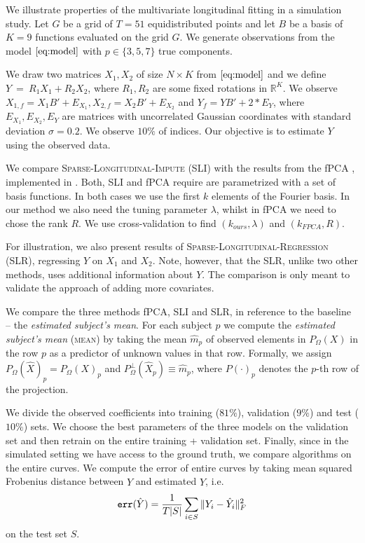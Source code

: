 \documentclass[preprint]{imsart}
\numberwithin{equation}{section}
\theoremstyle{plain}
\newcommand{\R}{\mathbb{R}}
\DeclareMathOperator*{\diag}{diag}
\begin{document}
We illustrate properties of the multivariate longitudinal fitting in a simulation study. Let $G$ be a grid of $T = 51$ equidistributed points and let $B$ be a basis of $K = 9$ functions evaluated on the grid $G$. We generate observations from the model $\eqref{eq:model}$ with $p \in \{3,5,7\}$ true components. %

We draw two matrices $X_1,X_2$ of size $N \times K$ from $\eqref{eq:model}$ and we define $Y~=~R_1 X_1 + R_2 X_2$, where $R_1,R_2$ are some fixed rotations in $\R^K$. We observe $X_{1,f} = X_1B' + E_{X_1}, X_{2,f} = X_2 B' + E_{X_2}$ and $Y_f = YB' + 2* E_Y$, where $E_{X_1},E_{X_2},E_{Y}$ are matrices with uncorrelated Gaussian coordinates with standard deviation $\sigma = 0.2$. We observe $10\%$ of indices. Our objective is to estimate $Y$ using the observed data.

We compare \textsc{Sparse-Longitudinal-Impute} (SLI) with the results from the fPCA \citep{james2000principal}, implemented in \citet{peng2009geometric}. Both, SLI and fPCA require are parametrized with a set of basis functions. In both cases we use the first $k$ elements of the Fourier basis. In our method we also need the tuning parameter $\lambda$, whilst in fPCA we need to chose the rank $R$. We use cross-validation to find $(k_{ours},\lambda)$ and $(k_{FPCA},R)$.

For illustration, we also present results of \textsc{Sparse-Longitudinal-Regression} (SLR), regressing $Y$ on $X_1$ and $X_2$. Note, however, that the SLR, unlike two other methods, uses additional information about $Y$. The comparison is only meant to validate the approach of adding more covariates.

We compare the three methods fPCA, SLI and SLR, in reference to the baseline -- the {\it estimated subject's mean}. For each subject $p$ we compute the {\it estimated subject's mean} (\textsc{mean}) by taking the mean $\hat{m}_p$ of observed elements in $P_\Omega(X)$ in the row $p$ as a predictor of unknown values in that row. Formally, we assign $P_\Omega(\hat{X})_p = P_\Omega(X)_p$ and $P^\perp_\Omega (\hat{X}_p) \equiv \hat{m}_p$, where $P(\cdot)_p$ denotes the $p$-th row of the projection.

We divide the observed coefficients into training ($81\%$), validation ($9\%$) and test ($10\%$) sets. We choose the best parameters of the three models on the validation set and then retrain on the entire training + validation set. Finally, since in the simulated setting we have access to the ground truth, we compare algorithms on the entire curves. We compute the error of entire curves by taking mean squared Frobenius distance between $Y$ and estimated $\hat{Y}$, i.e.
\[
 \verb|err|(\hat{Y}) = \frac{1}{T|S|} \sum_{i\in S} \|Y_i - \hat{Y}_i \|_F^2
 \]
 on the test set $S$.
 
\end{document}
